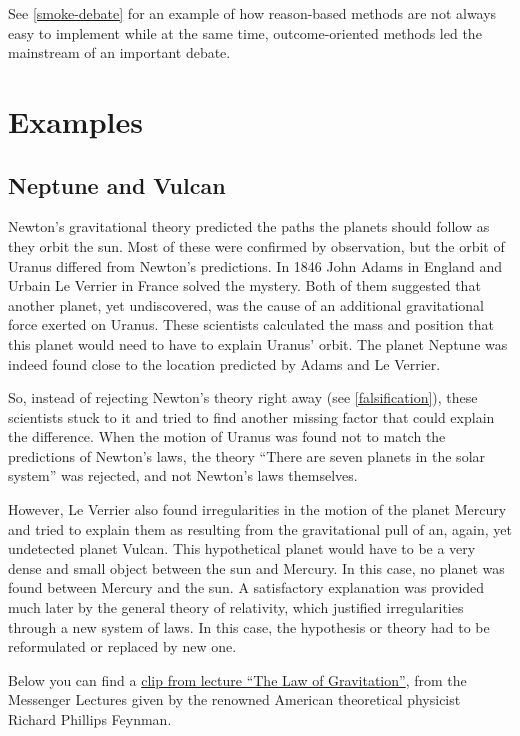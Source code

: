 \documentclass[
]{book}
\begin{document}
See \ref{smoke-debate} for an example of how reason-based methods are not always easy to implement while at the same time, outcome-oriented methods led the mainstream of an important debate.

\newpage

\hypertarget{examples}{%
\section{Examples}\label{examples}}

\hypertarget{neptune-vulcan}{%
\subsection{Neptune and Vulcan}\label{neptune-vulcan}}

Newton's gravitational theory predicted the paths the planets should follow as they orbit the sun. Most of these were confirmed by observation, but the orbit of Uranus differed from Newton's predictions. In 1846 John Adams in England and Urbain Le Verrier in France solved the mystery. Both of them suggested that another planet, yet undiscovered, was the cause of an additional gravitational force exerted on Uranus. These scientists calculated the mass and position that this planet would need to have to explain Uranus' orbit. The planet Neptune was indeed found close to the location predicted by Adams and Le Verrier.

So, instead of rejecting Newton's theory right away (see \ref{falsification}), these scientists stuck to it and tried to find another missing factor that could explain the difference. When the motion of Uranus was found not to match the predictions of Newton's laws, the theory ``There are seven planets in the solar system'' was rejected, and not Newton's laws themselves.

However, Le Verrier also found irregularities in the motion of the planet Mercury and tried to explain them as resulting from the gravitational pull of an, again, yet undetected planet Vulcan. This hypothetical planet would have to be a very dense and small object between the sun and Mercury. In this case, no planet was found between Mercury and the sun. A satisfactory explanation was provided much later by the general theory of relativity, which justified irregularities through a new system of laws. In this case, the hypothesis or theory had to be reformulated or replaced by new one.

Below you can find a \href{https://www.youtube.com/watch?v=j3mhkYbznBk\&t=1830s}{clip from lecture ``The Law of Gravitation''}, from the Messenger Lectures given by the renowned American theoretical physicist Richard Phillips Feynman.
\end{document}
